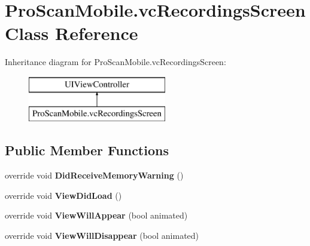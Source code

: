 \hypertarget{class_pro_scan_mobile_1_1vc_recordings_screen}{\section{Pro\-Scan\-Mobile.\-vc\-Recordings\-Screen Class Reference}
\label{class_pro_scan_mobile_1_1vc_recordings_screen}
}
Inheritance diagram for Pro\-Scan\-Mobile.\-vc\-Recordings\-Screen\-:\begin{figure}[H]
\begin{center}
\leavevmode
\includegraphics[height=2.000000cm]{class_pro_scan_mobile_1_1vc_recordings_screen}
\end{center}
\end{figure}
\subsection*{Public Member Functions}
\begin{DoxyCompactItemize}
\item 
\hypertarget{class_pro_scan_mobile_1_1vc_recordings_screen_a808c7d24104740d191d40d927bf41a48}{override void {\bfseries Did\-Receive\-Memory\-Warning} ()}\label{class_pro_scan_mobile_1_1vc_recordings_screen_a808c7d24104740d191d40d927bf41a48}

\item 
\hypertarget{class_pro_scan_mobile_1_1vc_recordings_screen_a4c0b51fad8f55ca86aebb07ddae4dcd6}{override void {\bfseries View\-Did\-Load} ()}\label{class_pro_scan_mobile_1_1vc_recordings_screen_a4c0b51fad8f55ca86aebb07ddae4dcd6}

\item 
\hypertarget{class_pro_scan_mobile_1_1vc_recordings_screen_a86b2e5c8fafdc097fb5a93fab2e485f8}{override void {\bfseries View\-Will\-Appear} (bool animated)}\label{class_pro_scan_mobile_1_1vc_recordings_screen_a86b2e5c8fafdc097fb5a93fab2e485f8}

\item 
\hypertarget{class_pro_scan_mobile_1_1vc_recordings_screen_a3d6b9a192bd10f5742b853197f371ece}{override void {\bfseries View\-Will\-Disappear} (bool animated)}\label{class_pro_scan_mobile_1_1vc_recordings_screen_a3d6b9a192bd10f5742b853197f371ece}

\end{DoxyCompactItemize}


